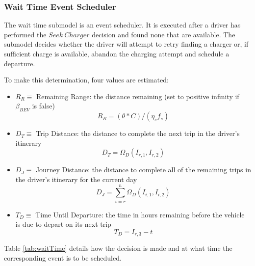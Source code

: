 \documentclass[journal]{IEEEtran}
\begin{document}
\subsubsection{Wait Time Event Scheduler}\label{waitSched}
The wait time submodel is an event scheduler.  It is executed after a driver has performed the $Seek ~Charger$ decision and found none that are available.  The submodel decides whether the driver will attempt to retry finding a charger or, if sufficient charge is available, abandon the charging attempt and schedule a departure.  

To make this determination, four values are estimated: 
\begin{itemize}
  \item	$R_R \equiv$ Remaining Range: the distance remaining (set to positive infinity if $\beta_{BEV}$ is false)
    \begin{equation}\label{eqn:R_R}
      R_R = (\theta * C)/(\eta_e f_s)
    \end{equation}
  \item	$D_T \equiv$ Trip Distance: the distance to complete the next trip in the driver's itinerary
    \begin{equation}\label{eqn:D_T}
      D_T = \Omega_D(I_{r,1},I_{r,2})
    \end{equation}
\item	$D_J \equiv$ Journey Distance: the distance to complete all of the remaining trips in the driver's itinerary for the current day
    \begin{equation}\label{eqn:D_J}
      D_J = \sum_{i=r}^{n} \Omega_D(I_{i,1},I_{i,2})
    \end{equation}
\item	$T_D \equiv$ Time Until Departure: the time in hours remaining before the vehicle is due to depart on its next trip
    \begin{equation}\label{eqn:T_D}
      T_D = I_{r,3} - t
    \end{equation}
\end{itemize}

Table \ref{tab:waitTime} details how the decision is made and at what time the corresponding event is to be scheduled.
\end{document}
